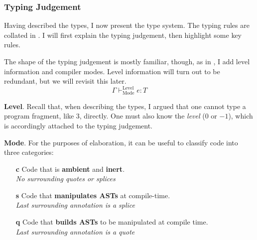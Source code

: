 \subsubsection{Typing Judgement}
Having described the types, I now present the type system. The typing rules are collated in . I will first explain the typing judgement, then highlight some key rules. 

The shape of the typing judgement is mostly familiar, though, as in \citet{xie-2023}, I add level information and compiler modes. Level information will turn out to be redundant, but we will revisit this later.
\[\Gamma \vdash^{\text{Level}}_{\text{Mode}} e: T\]

\textbf{Level}. Recall that, when describing the \efflang{} types, I argued that one cannot type a program fragment, like $3$, directly. One must also know the \textit{level} ($0$ or $-1$), which is accordingly attached to the typing judgement.


\newcommand{\compilemode}{\textbf{\textsf{\textcolor{compile}{c}}}}
\newcommand{\splicemode}{\textbf{\textsf{\textcolor{splice}{s}}}}
\newcommand{\quotemode}{\textbf{\textsf{\textcolor{quote}{q}}}}
\textbf{Mode}. For the purposes of elaboration, it can be useful to classify code into three categories:

\begin{enumerate}
  \item[\compilemode] Code that is \textcolor{compile}{\textbf{ambient}} and \textcolor{compile}{\textbf{inert}}.\\
  \textit{No surrounding quotes or splices}
  \item[\splicemode] Code that \textcolor{splice}{\textbf{manipulates ASTs}} at compile-time. \\
  \textit{Last surrounding annotation is a splice}
  \item[\quotemode] Code that \textcolor{quote}{\textbf{builds ASTs}} to be manipulated at compile time. \\
  \textit{Last surrounding annotation is a quote}
\end{enumerate}

